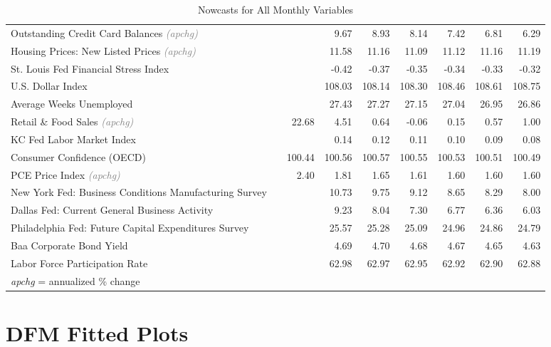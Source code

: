 \documentclass[11pt, letterpaper]{article}\usepackage[]{graphicx}\usepackage[]{color}
\begin{document}
\begin{table}[H]
\begin{tabular}{lrrrrrrrr}
  Outstanding Credit Card Balances \textit{\footnotesize\textcolor{gray}{(apchg)}} &  &  & 9.67 & 8.93 & 8.14 & 7.42 & 6.81 & 6.29 \\ 
  Housing Prices: New Listed Prices \textit{\footnotesize\textcolor{gray}{(apchg)}} &  &  & 11.58 & 11.16 & 11.09 & 11.12 & 11.16 & 11.19 \\ 
  St. Louis Fed Financial Stress Index &  &  & -0.42 & -0.37 & -0.35 & -0.34 & -0.33 & -0.32 \\ 
  U.S. Dollar Index &  &  & 108.03 & 108.14 & 108.30 & 108.46 & 108.61 & 108.75 \\ 
  Average Weeks Unemployed &  &  & 27.43 & 27.27 & 27.15 & 27.04 & 26.95 & 26.86 \\ 
  Retail \& Food Sales \textit{\footnotesize\textcolor{gray}{(apchg)}} &  & 22.68 & 4.51 & 0.64 & -0.06 & 0.15 & 0.57 & 1.00 \\ 
  KC Fed Labor Market Index &  &  & 0.14 & 0.12 & 0.11 & 0.10 & 0.09 & 0.08 \\ 
  Consumer Confidence (OECD) &  & 100.44 & 100.56 & 100.57 & 100.55 & 100.53 & 100.51 & 100.49 \\ 
  PCE Price Index \textit{\footnotesize\textcolor{gray}{(apchg)}} &  & 2.40 & 1.81 & 1.65 & 1.61 & 1.60 & 1.60 & 1.60 \\ 
  New York Fed: Business Conditions Manufacturing Survey &  &  & 10.73 & 9.75 & 9.12 & 8.65 & 8.29 & 8.00 \\ 
  Dallas Fed: Current General Business Activity &  &  & 9.23 & 8.04 & 7.30 & 6.77 & 6.36 & 6.03 \\ 
  Philadelphia Fed: Future Capital Expenditures Survey &  &  & 25.57 & 25.28 & 25.09 & 24.96 & 24.86 & 24.79 \\ 
  Baa Corporate Bond Yield &  &  & 4.69 & 4.70 & 4.68 & 4.67 & 4.65 & 4.63 \\ 
  Labor Force Participation Rate &  &  & 62.98 & 62.97 & 62.95 & 62.92 & 62.90 & 62.88 \\ 
   \hline 
 \textit{apchg} = annualized \% change 
\end{tabular}
\endgroup
\caption{Nowcasts for All Monthly Variables} 
\end{table}



\appendix
\appendixpage
\addappheadtotoc

\section{DFM Fitted Plots}
\end{document}
